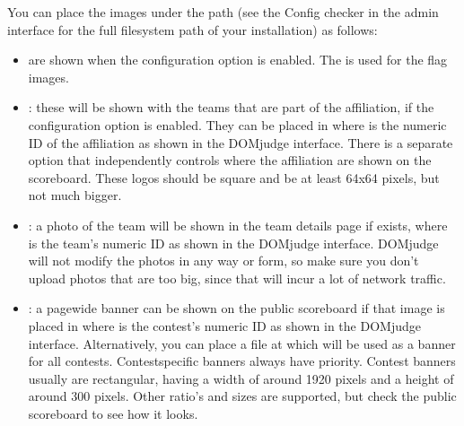 \documentclass[a4paper,10pt,english,openany]{sphinxmanual}
\begin{document}
\sphinxAtStartPar
You can place the images under the path  (see
the Config checker in the admin interface for the full filesystem
path of your installation) as follows:
\begin{itemize}
\item {} 
\sphinxAtStartPar
{} are shown when the  configuration option
is enabled. The 
is used for the flag images.

\item {} 
\sphinxAtStartPar
{}: these will be shown with the teams that are
part of the affiliation, if the  configuration
option is enabled. They can be placed in
 where  is the numeric ID
of the affiliation as shown in the DOMjudge interface. There is a
separate option  that independently controls where
the affiliation  are shown on the scoreboard. These logos should be
square and be at least 64x64 pixels, but not much bigger.

\item {} 
\sphinxAtStartPar
{}: a photo of the team will be shown in the team details
page if  exists, where  is the
team’s numeric ID as shown in the DOMjudge interface. DOMjudge will not
modify the photos in any way or form, so make sure you don’t upload photos
that are too big, since that will incur a lot of network traffic.

\item {} 
\sphinxAtStartPar
{}: a page\sphinxhyphen{}wide banner can be shown on the public scoreboard
if that image is placed in  where  is the
contest’s numeric ID as shown in the DOMjudge interface. Alternatively, you
can place a file at  which will be used as a banner
for all contests. Contest\sphinxhyphen{}specific banners always have priority. Contest
banners usually are rectangular, having a width of around 1920 pixels and a
height of around 300 pixels. Other ratio’s and sizes are supported, but check
the public scoreboard to see how it looks.

\end{itemize}
\end{document}
